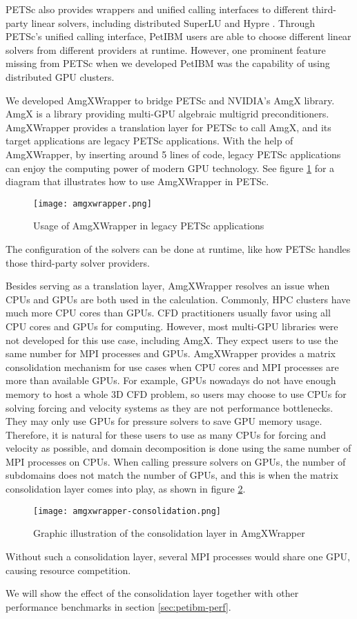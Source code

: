 PETSc also provides wrappers and unified calling interfaces to different third-party linear solvers, including distributed SuperLU \cite{sao_communication-avoiding_2019} and Hypre \cite{noauthor_hypre_nodate}.
Through PETSc's unified calling interface, PetIBM users are able to choose different linear solvers from different providers at runtime. 
However, one prominent feature missing from PETSc when we developed PetIBM was the capability of using distributed GPU clusters.

We developed AmgXWrapper \cite{chuang_geoclaw-arcgis_2019} to bridge PETSc and NVIDIA's AmgX library.
AmgX is a library providing multi-GPU algebraic multigrid preconditioners.
AmgXWrapper provides a translation layer for PETSc to call AmgX, and its target applications are legacy PETSc applications. 
With the help of AmgXWrapper, by inserting around 5 lines of code, legacy PETSc applications can enjoy the computing power of modern GPU technology.
See figure \ref{fig:amgxwrapper} for a diagram that illustrates how to use AmgXWrapper in PETSc.
\begin{figure}[hbt!]
    \texttt{[image: amgxwrapper.png]}
    \caption{Usage of AmgXWrapper in legacy PETSc applications}
    \label{fig:amgxwrapper}
\end{figure}
The configuration of the solvers can be done at runtime, like how PETSc handles those third-party solver providers.

Besides serving as a translation layer, AmgXWrapper resolves an issue when CPUs and GPUs are both used in the calculation.
Commonly, HPC clusters have much more CPU cores than GPUs.
CFD practitioners usually favor using all CPU cores and GPUs for computing.
However, most multi-GPU libraries were not developed for this use case, including AmgX.
They expect users to use the same number for MPI processes and GPUs.
AmgXWrapper provides a matrix consolidation mechanism for use cases when CPU cores and MPI processes are more than available GPUs.
For example, GPUs nowadays do not have enough memory to host a whole 3D CFD problem, so users may choose to use CPUs for solving forcing and velocity systems as they are not performance bottlenecks.
They may only use GPUs for pressure solvers to save GPU memory usage.
Therefore, it is natural for these users to use as many CPUs for forcing and velocity as possible, and domain decomposition is done using the same number of MPI processes on CPUs.
When calling pressure solvers on GPUs, the number of subdomains does not match the number of GPUs, and this is when the matrix consolidation layer comes into play, as shown in figure \ref{fig:amgxwrapper-consolidation}.
\begin{figure}[hbt!]
    \texttt{[image: amgxwrapper-consolidation.png]}
    \caption{Graphic illustration of the consolidation layer in AmgXWrapper}
    \label{fig:amgxwrapper-consolidation}
\end{figure}
Without such a consolidation layer, several MPI processes would share one GPU, causing resource competition.

We will show the effect of the consolidation layer together with other performance benchmarks in section \ref{sec:petibm-perf}.
